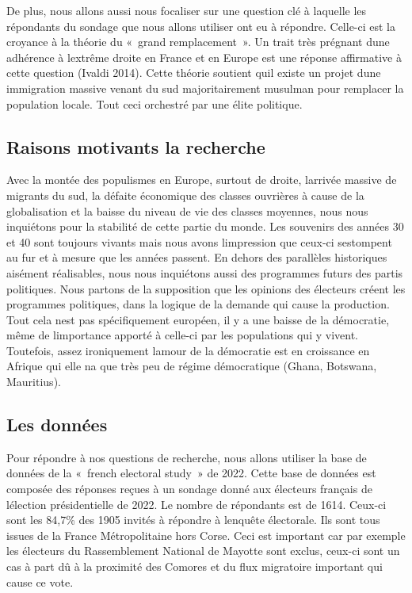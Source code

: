 \documentclass[
  letterpaper,
  DIV=11,
  numbers=noendperiod]{scrartcl}
\begin{document}
De plus, nous allons aussi nous focaliser sur une question clé à
laquelle les répondants du sondage que nous allons utiliser ont eu à
répondre. Celle-ci est la croyance à la théorie du «~grand
remplacement~». Un trait très prégnant d\textquotesingle une adhérence à
l\textquotesingle extrême droite en France et en Europe est une réponse
affirmative à cette question (Ivaldi 2014). Cette théorie soutient
qu\textquotesingle il existe un projet d\textquotesingle une immigration
massive venant du sud majoritairement musulman pour remplacer la
population locale. Tout ceci orchestré par une élite politique.

\hypertarget{raisons-motivants-la-recherche}{%
\subsection{Raisons motivants la
recherche}\label{raisons-motivants-la-recherche}}

Avec la montée des populismes en Europe, surtout de droite,
l\textquotesingle arrivée massive de migrants du sud, la défaite
économique des classes ouvrières à cause de la globalisation et la
baisse du niveau de vie des classes moyennes, nous nous inquiétons pour
la stabilité de cette partie du monde. Les souvenirs des années 30 et 40
sont toujours vivants mais nous avons l\textquotesingle impression que
ceux-ci s\textquotesingle estompent au fur et à mesure que les années
passent. En dehors des parallèles historiques aisément réalisables, nous
nous inquiétons aussi des programmes futurs des partis politiques. Nous
partons de la supposition que les opinions des électeurs créent les
programmes politiques, dans la logique de la demande qui cause la
production. Tout cela n\textquotesingle est pas spécifiquement européen,
il y a une baisse de la démocratie, même de l\textquotesingle importance
apporté à celle-ci par les populations qui y vivent. Toutefois, assez
ironiquement l\textquotesingle amour de la démocratie est en croissance
en Afrique qui elle n\textquotesingle a que très peu de régime
démocratique (Ghana, Botswana, Mauritius).

\hypertarget{les-donnuxe9es}{%
\subsection{Les données}\label{les-donnuxe9es}}

Pour répondre à nos questions de recherche, nous allons utiliser la base
de données de la «~french electoral study~» de 2022. Cette base de
données est composée des réponses reçues à un sondage donné aux
électeurs français de l\textquotesingle élection présidentielle de 2022.
Le nombre de répondants est de 1614. Ceux-ci sont les 84,7\% des 1905
invités à répondre à l\textquotesingle enquête électorale. Ils sont tous
issues de la France Métropolitaine hors Corse. Ceci est important car
par exemple les électeurs du Rassemblement National de Mayotte sont
exclus, ceux-ci sont un cas à part dû à la proximité des Comores et du
flux migratoire important qui cause ce vote.
\end{document}
